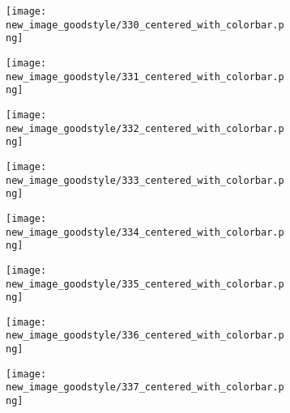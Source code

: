 \documentclass[a4paper,12pt]{article}
\begin{document}
\begin{figure}[H]
  \begin{subfigure}{0.11\textwidth}
    \texttt{[image: new\_image\_goodstyle/330\_centered\_with\_colorbar.png]}
  \end{subfigure}
  \hfill
  \begin{subfigure}{0.11\textwidth}
    \texttt{[image: new\_image\_goodstyle/331\_centered\_with\_colorbar.png]}
  \end{subfigure}
  \hfill
  \begin{subfigure}{0.11\textwidth}
    \texttt{[image: new\_image\_goodstyle/332\_centered\_with\_colorbar.png]}
  \end{subfigure}
  \hfill
  \begin{subfigure}{0.11\textwidth}
    \texttt{[image: new\_image\_goodstyle/333\_centered\_with\_colorbar.png]}
  \end{subfigure}
  \hfill
  \begin{subfigure}{0.11\textwidth}
    \texttt{[image: new\_image\_goodstyle/334\_centered\_with\_colorbar.png]}
  \end{subfigure}
  \hfill
  \begin{subfigure}{0.11\textwidth}
    \texttt{[image: new\_image\_goodstyle/335\_centered\_with\_colorbar.png]}
  \end{subfigure}
  \hfill
  \begin{subfigure}{0.11\textwidth}
    \texttt{[image: new\_image\_goodstyle/336\_centered\_with\_colorbar.png]}
  \end{subfigure}
  \hfill
  \begin{subfigure}{0.11\textwidth}
    \texttt{[image: new\_image\_goodstyle/337\_centered\_with\_colorbar.png]}
  \end{subfigure}
  \hfill
\end{figure}
\end{document}
